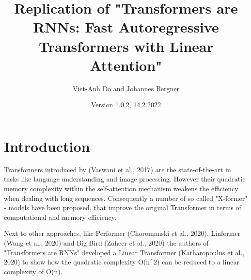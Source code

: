 \documentclass[DIV=13,fontsize=11pt]{scrartcl}
\title{Replication of "Transformers are RNNs: Fast Autoregressive Transformers with Linear Attention"}
\author{Viet-Anh Do and Johannes Bergner}
\date{Version 1.0.2, 14.2.2022}
\begin{document}
\maketitle
\section{Introduction}

Transformers introduced by (Vaswani et al., 2017) are the state-of-the-art in  tasks like language understanding and image processing.  However their quadratic memory complexity within the self-attention mechanism weakens the efficiency when dealing with long sequences.  Consequently a number of so called "X-former" - models have been proposed, that improve the original Transformer in terms of computational and memory efficiency.

Next to other approaches, like Performer (Choromanski et al., 2020), Linformer (Wang et al., 2020) and Big Bird (Zaheer et al., 2020) the authors of "Transformers are RNNs" developed a Linear Transformer (Katharopoulus et al., 2020) to show how the quadratic complexity O(n^2) can be reduced to a linear complexity of O(n).




\end{document}
